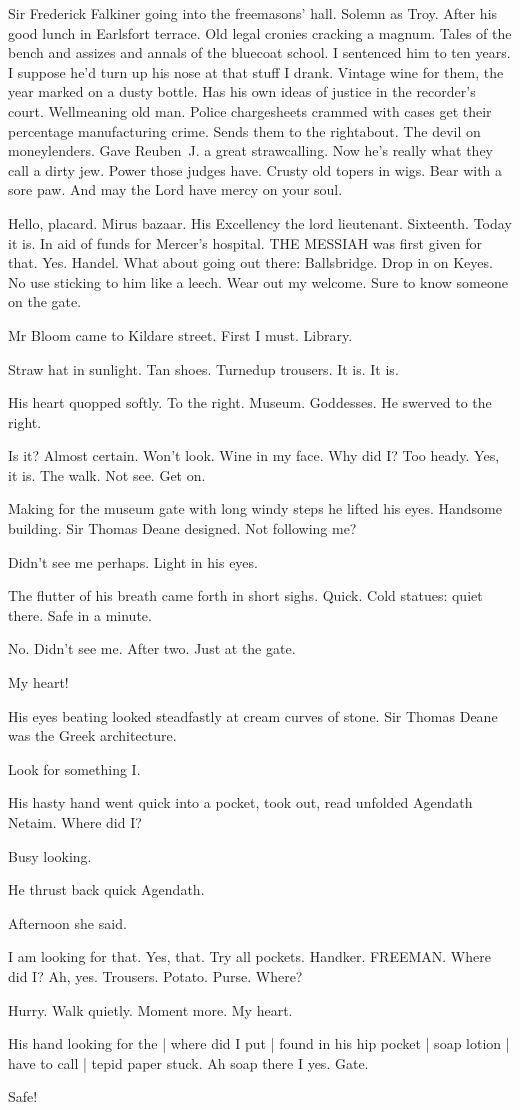 Sir Frederick Falkiner going into the freemasons' hall.
Solemn as Troy.
After his good lunch in Earlsfort terrace.
Old legal cronies cracking a magnum.
Tales of the bench and assizes and annals of the bluecoat school.
I sentenced him to ten years.
I suppose he'd turn up his nose at that stuff I drank.
Vintage wine for them,
the year marked on a dusty bottle.
Has his own ideas of justice in the recorder's court.
Wellmeaning old man.
Police chargesheets crammed with cases get their percentage manufacturing crime.
Sends them to the rightabout.
The devil on moneylenders.
Gave Reuben~J. a great strawcalling.
Now he's really what they call a dirty jew.
Power those judges have.
Crusty old topers in wigs.
Bear with a sore paw.
And may the Lord have mercy on your soul.

Hello, placard.
Mirus bazaar.
His Excellency the lord lieutenant.
Sixteenth.
Today it is.
In aid of funds for Mercer's hospital.
THE MESSIAH was first given for that.
Yes.
Handel.
What about going out there:
Ballsbridge.
Drop in on Keyes.
No use sticking to him like a leech.
Wear out my welcome.
Sure to know someone on the gate.

Mr Bloom came to Kildare street.
First I must.
Library.

Straw hat in sunlight.
Tan shoes.
Turnedup trousers.
It is.
It is.

His heart quopped softly.
To the right.
Museum.
Goddesses.
He swerved to the right.%

Is it?
Almost certain.
Won't look.
Wine in my face.
Why did I?
Too heady.
Yes,
it is.
The walk.
Not see.
Get on.

Making for the museum gate with long windy steps he lifted his eyes.
Handsome building.
Sir Thomas Deane designed.
Not following me?

Didn't see me perhaps.
Light in his eyes.

The flutter of his breath came forth in short sighs.
Quick.
Cold statues:
quiet there.
Safe in a minute.

No.
Didn't see me.
After two.
Just at the gate.

My heart!

His eyes beating looked steadfastly at cream curves of stone.
Sir Thomas
Deane was the Greek architecture.

Look for something I.

His hasty hand went quick into a pocket,
took out,
read unfolded Agendath Netaim.
Where did I?

Busy looking.

He thrust back quick Agendath.

Afternoon she said.

I am looking for that.
Yes, that.
Try all pockets.
Handker.
FREEMAN.
Where did I?
Ah, yes.
Trousers.
Potato.
Purse.
Where?

Hurry.
Walk quietly.
Moment more.
My heart.

His hand looking for the |
where did I put |
found in his hip pocket |
soap lotion |
have to call |
tepid paper stuck.
Ah soap there I yes.
Gate.

Safe!


